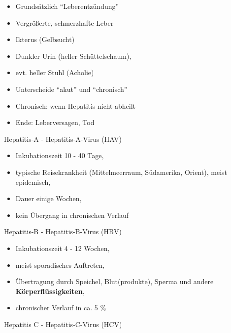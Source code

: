 \documentclass{article}
\newcommand\gEs[1]{\textbf{\textcolor[rgb]{0.0,0.0,0.5019608}{#1}}}
\newcommand\gEs[1]{\textbf{\textcolor[rgb]{0.0,0.0,0.5019608}{#1}}}
\newcommand\gZ[1]{\textcolor[rgb]{0.5019608,0.5019608,0.5019608}{#1}}
\begin{document}
\begin{itemize}
\item {\mdseries
Grunds\"atzlich
{\textquotedblleft}Leberentz\"undung{\textquotedblright}}

\item {\mdseries
Vergr\"o{\ss}erte, schmerzhafte Leber }

\item {\mdseries
Ikterus (Gelbsucht) }

\item {\mdseries
Dunkler Urin (heller Sch\"uttelschaum),}

\item {\mdseries
evt. heller Stuhl (Acholie)}

\item {\mdseries
Unterscheide {\textquotedblleft}akut{\textquotedblright} und
{\textquotedblleft}chronisch{\textquotedblright}}

\end{itemize}
\begin{itemize}
\item {\mdseries
Chronisch: wenn Hepatitis nicht abheilt}

\end{itemize}
\begin{itemize}
\item {\mdseries
Ende: Leberversagen, Tod}

\end{itemize}
{\mdseries\color{black}
Hepatitis-A - Hepatitis-A-Virus (HAV)}

\begin{itemize}
\item {\mdseries
\gZ{Inkubationszeit 10 - 40 Tage, }}

\item {\mdseries
typische Reisekrankheit (Mittelmeerraum, S\"udamerika, Orient), meist
epidemisch, }

\item {\mdseries
Dauer einige Wochen, }

\item {\mdseries
kein \"Ubergang in chronischen Verlauf}

\end{itemize}
{\mdseries\color{black}
Hepatitis-B - Hepatitis-B-Virus (HBV)}

\begin{itemize}
\item {\mdseries
\gZ{Inkubationszeit 4 - 12 Wochen, }}

\item {\mdseries
meist sporadisches Auftreten, }

\item {\mdseries
\"Ubertragung durch Speichel, Blut(produkte), Sperma und andere
\gEs{K\"orperfl\"ussigkeiten}, }

\item {\mdseries
chronischer Verlauf in ca. 5 \%}

\end{itemize}
{\mdseries\color{black}
Hepatitis C - Hepatitis-C-Virus (HCV)}
\end{document}
